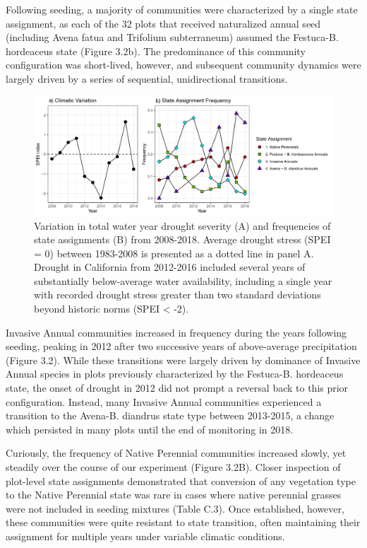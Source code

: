 \documentclass[twoside,12pt,final]{ucthesis-CA2012}
\begin{document}
\begin{ucmainmatter}
Following seeding, a majority of communities were characterized by a single state assignment, as each of the 32 plots that received naturalized annual seed (including Avena fatua and Trifolium subterraneum) assumed the Festuca-B. hordeaceus state (Figure 3.2b).
The predominance of this community configuration was short-lived, however, and subsequent community dynamics were largely driven by a series of sequential, unidirectional transitions.
\begin{figure}
\centering
\includegraphics[width=\textwidth,height=0.3\textheight]{figure/Fig3_1.png}
\caption{Variation in total water year drought severity (A) and frequencies of state assignments (B) from 2008-2018. Average drought stress (SPEI = 0) between 1983-2008 is presented as a dotted line in panel A. Drought in California from 2012-2016 included several years of substantially below-average water availability, including a single year with recorded drought stress greater than two standard deviations beyond historic norms (SPEI \textless{} -2). \label{fig-3-2}}
\end{figure}
Invasive Annual communities increased in frequency during the years following seeding, peaking in 2012 after two successive years of above-average precipitation (Figure 3.2).
While these transitions were largely driven by dominance of Invasive Annual species in plots previously characterized by the Festuca-B. hordeaceus state, the onset of drought in 2012 did not prompt a reversal back to this prior configuration.
Instead, many Invasive Annual communities experienced a transition to the Avena-B. diandrus state type between 2013-2015, a change which persisted in many plots until the end of monitoring in 2018.

Curiously, the frequency of Native Perennial communities increased slowly, yet steadily over the course of our experiment (Figure 3.2B).
Closer inspection of plot-level state assignments demonstrated that conversion of any vegetation type to the Native Perennial state was rare in cases where native perennial grasses were not included in seeding mixtures (Table C.3).
Once established, however, these communities were quite resistant to state transition, often maintaining their assignment for multiple years under variable climatic conditions.


\end{ucmainmatter}
\end{document}
